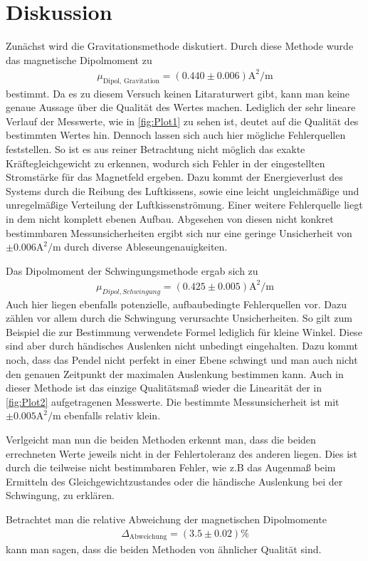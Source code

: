 \section{Diskussion}
\label{sec:Diskussion}
Zunächst wird die Gravitationsmethode diskutiert. Durch diese Methode wurde das magnetische Dipolmoment zu
\begin{align*}
    \mu_{\text{Dipol, Gravitation}} = (0.440 \pm 0.006)\unit{\ampere\squared\per\metre}
\end{align*}
bestimmt. Da es zu diesem Versuch keinen Litaraturwert gibt, kann man keine genaue Aussage über die Qualität des 
Wertes machen. Lediglich der sehr lineare Verlauf der Messwerte, wie in \autoref{fig:Plot1} zu sehen ist, deutet auf die Qualität des bestimmten Wertes hin. 
Dennoch lassen sich auch hier mögliche Fehlerquellen feststellen. So ist es aus reiner Betrachtung nicht möglich das exakte Kräftegleichgewicht zu erkennen, wodurch sich Fehler in der 
eingestellten Stromstärke für das Magnetfeld ergeben. Dazu kommt der Energieverlust des Systems durch die Reibung des Luftkissens, sowie eine leicht ungleichmäßige und unregelmäßige
Verteilung der Luftkissenströmung. Einer weitere Fehlerquelle liegt in dem nicht komplett ebenen Aufbau.
Abgesehen von diesen nicht konkret bestimmbaren Messunsicherheiten ergibt sich nur eine geringe Unsicherheit von $\pm 0.006 \unit{\ampere\squared\per\metre}$ durch 
diverse Ableseungenauigkeiten.

Das Dipolmoment der Schwingungsmethode ergab sich zu
\begin{align*} 
    \mu_{Dipol, Schwingung} = (0.425 \pm 0.005)\unit{\ampere\squared\per\metre}
\end{align*}   
Auch hier liegen ebenfalls potenzielle, aufbaubedingte Fehlerquellen vor. Dazu zählen vor allem durch die Schwingung verursachte Unsicherheiten.
So gilt zum Beispiel die zur Bestimmung verwendete Formel lediglich für kleine Winkel. Diese sind aber durch 
händisches Auslenken nicht unbedingt eingehalten. Dazu kommt noch, dass das Pendel nicht perfekt in einer Ebene schwingt und man auch nicht den genauen Zeitpunkt der 
maximalen Auslenkung bestimmen kann. Auch in dieser Methode ist das einzige Qualitätsmaß wieder die Linearität der in \autoref{fig:Plot2} aufgetragenen Messwerte. 
Die bestimmte Messunsicherheit ist mit $\pm 0.005\unit{\ampere\squared\per\metre}$ ebenfalls relativ klein. 


Verlgeicht man nun die beiden Methoden erkennt man, dass die beiden errechneten Werte jeweils nicht in der Fehlertoleranz des anderen liegen. Dies ist durch die teilweise nicht 
bestimmbaren Fehler, wie z.B das Augenmaß beim  Ermitteln des Gleichgewichtzustandes oder die händische Auslenkung bei der Schwingung, zu erklären.


Betrachtet man die relative Abweichung der magnetischen Dipolmomente 
\begin{align*}
    \Delta_{\text{Abweichung}} = (3.5 \pm 0.02)\%
\end{align*}
kann man sagen, dass die beiden Methoden von ähnlicher Qualität sind.  